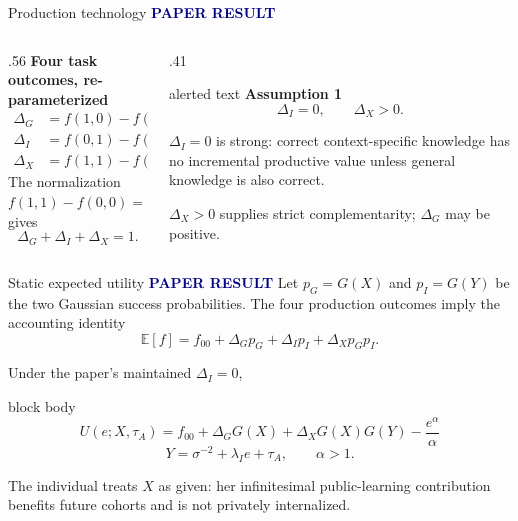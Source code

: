 \documentclass[aspectratio=169,10pt]{beamer}
\newcommand{\paperlabel}{\textcolor{Navy}{\scriptsize\bfseries PAPER RESULT}}
\begin{document}
\begin{frame}{Production technology}
  \paperlabel
  \vspace{.12cm}
  \begin{columns}[T,onlytextwidth]
    \begin{column}{.56\textwidth}
      \textbf{Four task outcomes, re-parameterized}
      \begin{align*}
        \Delta_G&=f(1,0)-f(0,0),\\
        \Delta_I&=f(0,1)-f(0,0),\\
        \Delta_X&=f(1,1)-f(1,0)-f(0,1)+f(0,0).
      \end{align*}
      The normalization $f(1,1)-f(0,0)=1$ gives
      \[
        \Delta_G+\Delta_I+\Delta_X=1.
      \]
    \end{column}
    \begin{column}{.41\textwidth}
      \begin{beamercolorbox}[rounded=true,sep=.8em]{alerted text}
        \centering\textbf{Assumption 1}
        \[
          \boxed{\Delta_I=0,\qquad \Delta_X>0.}
        \]
      \end{beamercolorbox}
      \vspace{.25cm}
      \small
      $\Delta_I=0$ is strong: correct context-specific knowledge has no
      incremental productive value unless general knowledge is also correct.

      \vspace{.2cm}
      $\Delta_X>0$ supplies strict complementarity; $\Delta_G$ may be positive.
    \end{column}
  \end{columns}
\end{frame}

\begin{frame}{Static expected utility}
  \paperlabel
  \vspace{.12cm}
  Let $p_G=G(X)$ and $p_I=G(Y)$ be the two Gaussian success probabilities.
  The four production outcomes imply the accounting identity
  \[
  \mathbb E[f]
   =f_{00}+\Delta_Gp_G+\Delta_Ip_I+\Delta_Xp_Gp_I.
  \]

  \vspace{.15cm}
  Under the paper's maintained $\Delta_I=0$,
  \begin{beamercolorbox}[rounded=true,sep=.7em]{block body}
  \[
  \boxed{
  U(e;X,\tau_A)=f_{00}+\Delta_GG(X)+\Delta_XG(X)G(Y)
  -\frac{e^\alpha}{\alpha}}
  \]
  \[
    Y=\sigma^{-2}+\lambda_Ie+\tau_A,\qquad \alpha>1.
  \]
  \end{beamercolorbox}

  \vspace{.2cm}
  \small The individual treats $X$ as given: her infinitesimal public-learning
  contribution benefits future cohorts and is not privately internalized.
\end{frame}
\end{document}
